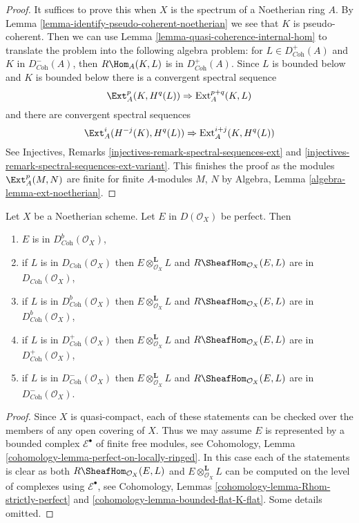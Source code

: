 \begin{proof}
It suffices to prove this when $X$ is the spectrum of
a Noetherian ring $A$.
By Lemma \ref{lemma-identify-pseudo-coherent-noetherian}
we see that $K$ is pseudo-coherent.
Then we can use Lemma \ref{lemma-quasi-coherence-internal-hom}
to translate the problem into the following algebra problem:
for $L \in D^+_{\textit{Coh}}(A)$ and $K$ in $D^-_{\textit{Coh}}(A)$, then
$R\Hom_A(K, L)$ is in $D^+_{\textit{Coh}}(A)$.
Since $L$ is bounded below and $K$ is bounded below there is a
convergent spectral sequence
$$
\Ext^p_A(K, H^q(L)) \Rightarrow \text{Ext}^{p + q}_A(K, L)
$$
and there are convergent spectral sequences
$$
\Ext^i_A(H^{-j}(K), H^q(L)) \Rightarrow \text{Ext}^{i + j}_A(K, H^q(L))
$$
See Injectives, Remarks \ref{injectives-remark-spectral-sequences-ext}
and \ref{injectives-remark-spectral-sequences-ext-variant}.
This finishes the proof as the modules $\Ext^p_A(M, N)$
are finite for finite $A$-modules $M$, $N$ by
Algebra, Lemma \ref{algebra-lemma-ext-noetherian}.
\end{proof}

\begin{lemma}
\label{lemma-perfect-on-noetherian}
Let $X$ be a Noetherian scheme. Let $E$ in $D(\mathcal{O}_X)$ be perfect.
Then
\begin{enumerate}
\item $E$ is in $D^b_{\textit{Coh}}(\mathcal{O}_X)$,
\item if $L$ is in $D_{\textit{Coh}}(\mathcal{O}_X)$ then
$E \otimes_{\mathcal{O}_X}^\mathbf{L} L$ and
$R\SheafHom_{\mathcal{O}_X}(E, L)$ are in
$D_{\textit{Coh}}(\mathcal{O}_X)$,
\item if $L$ is in $D^b_{\textit{Coh}}(\mathcal{O}_X)$ then
$E \otimes_{\mathcal{O}_X}^\mathbf{L} L$ and
$R\SheafHom_{\mathcal{O}_X}(E, L)$ are in
$D^b_{\textit{Coh}}(\mathcal{O}_X)$,
\item if $L$ is in $D^+_{\textit{Coh}}(\mathcal{O}_X)$ then
$E \otimes_{\mathcal{O}_X}^\mathbf{L} L$ and
$R\SheafHom_{\mathcal{O}_X}(E, L)$ are in
$D^+_{\textit{Coh}}(\mathcal{O}_X)$,
\item if $L$ is in $D^-_{\textit{Coh}}(\mathcal{O}_X)$ then
$E \otimes_{\mathcal{O}_X}^\mathbf{L} L$ and
$R\SheafHom_{\mathcal{O}_X}(E, L)$ are in
$D^-_{\textit{Coh}}(\mathcal{O}_X)$.
\end{enumerate}
\end{lemma}

\begin{proof}
Since $X$ is quasi-compact, each of these statements can be checked
over the members of any open covering of $X$.
Thus we may assume $E$ is represented by
a bounded complex $\mathcal{E}^\bullet$ of finite free modules, see
Cohomology, Lemma \ref{cohomology-lemma-perfect-on-locally-ringed}.
In this case each of the statements is clear as both
$R\SheafHom_{\mathcal{O}_X}(E, L)$
and $E \otimes_{\mathcal{O}_X}^\mathbf{L} L$ can be computed on the
level of complexes using $\mathcal{E}^\bullet$, see
Cohomology, Lemmas \ref{cohomology-lemma-Rhom-strictly-perfect} and
\ref{cohomology-lemma-bounded-flat-K-flat}. Some details omitted.
\end{proof}


